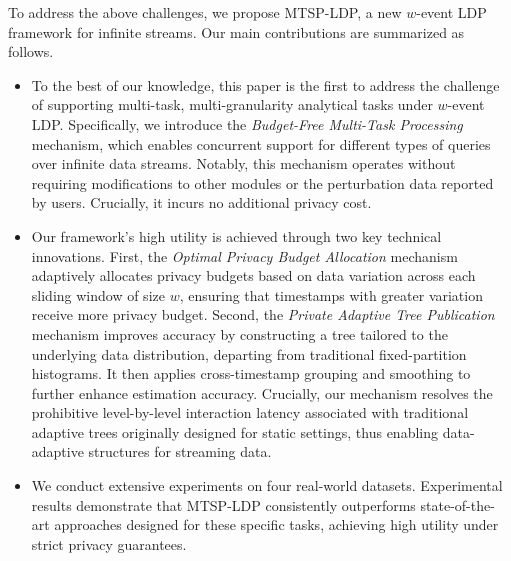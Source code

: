 \documentclass[acmsmall]{acmart}
\begin{document}
To address the above challenges, we propose MTSP-LDP, a new $w$-event LDP
framework for infinite streams.
Our main contributions are summarized as follows.
\begin{itemize}[nosep]
\item {To the best of our knowledge, this paper is the first to address the
  challenge of supporting multi-task, multi-granularity analytical tasks under
  $w$-event LDP.
  Specifically, we introduce the \emph{Budget-Free Multi-Task Processing}
  mechanism, which enables concurrent support for different types of queries
  over infinite data streams.
  Notably, this mechanism operates without requiring modifications to other
  modules or the perturbation data reported by users.
  Crucially, it incurs no additional privacy cost.}

\item {Our framework's high utility is achieved through two key technical
  innovations.
  First, the \emph{Optimal Privacy Budget Allocation} mechanism adaptively
  allocates privacy budgets based on data variation across each sliding window
  of size $w$, ensuring that timestamps with greater variation receive more
  privacy budget.
  Second, the \emph{Private Adaptive Tree Publication} mechanism improves accuracy by constructing a tree tailored to the underlying data distribution, departing from traditional fixed-partition histograms. It then applies cross-timestamp grouping and smoothing to further enhance estimation accuracy. Crucially, our mechanism resolves the prohibitive level-by-level interaction latency associated with traditional adaptive trees originally designed for static settings, thus enabling data-adaptive structures for streaming data.}

\item We conduct extensive experiments on four real-world datasets.
  Experimental results demonstrate that MTSP-LDP consistently outperforms
  state-of-the-art approaches designed for these specific tasks, achieving high
  utility under strict privacy guarantees.
\end{itemize}

\end{document}

